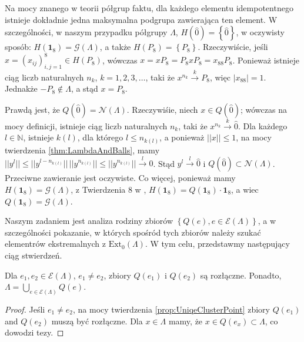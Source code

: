 \begin{Remark}
\label{rem:GOfLambda}
Na mocy znanego w teorii półgrup faktu, dla każdego elementu idempotentnego
istnieje dokładnie jedna maksymalna podgrupa zawierająca ten element.
W szczególności, w naszym przypadku półgrupy $\Lambda$,
$H(\hat{0}) = \left \{ \hat{0} \right \}$,
w oczywisty sposób:
$H(\mathbf{1}_{8}) = \mathcal{G}(\Lambda)$,
a także $H(P_{8}) = \left \{ P_{8} \right \}$.
Rzeczywiście,
jeśli $x = (x_{ij})_{i,j=1}^{8} \in H(P_{8})$,
wówczas
$x = x P_{8} = P_{8} x P_{8} = x_{88} P_{8}$.
Ponieważ istnieje ciąg liczb naturalnych  $n_{k}$, $k=1,2,3,\ldots$,
taki że $x^{n_{k}} \overset{k}{\rightarrow} P_{8}$,
więc
$|x_{88}| = 1$. Jednakże $- P_{8} \notin \Lambda$,
a stąd $x = P_{8}$.
\end{Remark}

\begin{Remark}
    \label{rem:Qof1}
Prawdą jest, że $Q(\hat{0}) = \mathcal{N}(\Lambda)$.
Rzeczywiśie, niech $x \in Q(\hat{0})$;
wówczas na mocy definicji,
istnieje ciąg liczb naturalnych $n_{k}$, taki że
$x^{n_{k}} \overset{k}{\rightarrow} \hat{0}$.
Dla każdego $l \in \mathbb{N}$, istnieje $k(l)$, dla którego
$l \leq n_{k(l)}$, a ponieważ
$||x|| \leq 1 $, na mocy twierdzenia \ref{thm:LambdaAndBalls}, mamy
$||y^{l}|| \leq ||y^{l - n_{k(l)}}|| \, ||y^{n_{k(l)}}|| \leq ||y^{n_{k(l)}}||
\overset{l}{\rightarrow} 0$.
Stąd $y^{l} \overset{l}{\rightarrow} \hat{0}$
i $Q(\hat{0}) \subset \mathcal{N}(\Lambda)$.
Przeciwne zawieranie jest oczywiste.
Co więcej, ponieważ mamy $H(\mathbf{1}_{8}) = \mathcal{G}(\Lambda)$,
    z Twierdzenia 8 w \cite{schwarz1955hausdorff},
    $H(\mathbf{1}_{8}) = Q(\mathbf{1}_{8}) \cdot \mathbf{1}_{8}$,
    a wiec $Q(\mathbf{1}_{8}) = \mathcal{G}(\Lambda)$.
\end{Remark}

Naszym zadaniem jest analiza rodziny zbiorów
$\left \{ Q(e), e \in \mathcal{E}(\Lambda) \right \}$,
a w szczególności pokazanie, w których spośród tych zbiorów należy szukać
elementrów ekstremalnych z
$\text{Ext}_{0}(\Lambda)$.
W tym celu, przedstawmy następujący ciąg stwierdzeń.

\begin{Theorem}
    Dla $e_{1}, e_{2} \in \mathcal{E}(\Lambda)$,
    $e_{1} \neq e_{2}$,
    zbiory $Q(e_{1})$ i $Q(e_{2})$ są rozłączne.
Ponadto,
    $\Lambda = \! \bigcup \limits_{e \in \mathcal{E}(\Lambda)} \! Q(e)$.
\end{Theorem}
\begin{proof}
Jeśli $e_{1} \neq e_{2}$, na mocy twierdzenia \ref{prop:UniqeClusterPoint}
zbiory $Q(e_{1})$ and $Q(e_{2})$ muszą być rozłączne.
Dla $x \in \Lambda$ mamy, że $x \in Q(e_{x}) \subset \Lambda$,
co dowodzi tezy.
\end{proof}

